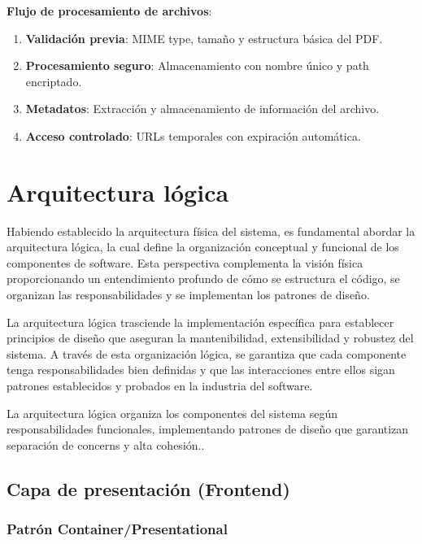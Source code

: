 \documentclass[12pt,a4paper,oneside]{report}
\providecommand{\tightlist}{%
  \setlength{\itemsep}{0pt}\setlength{\parskip}{0pt}}
\begin{document}
\textbf{Flujo de procesamiento de archivos}:

\begin{enumerate}
\def\labelenumi{\arabic{enumi}.}
\tightlist
\item
  \textbf{Validación previa}: MIME type, tamaño y estructura básica del
  PDF.
\item
  \textbf{Procesamiento seguro}: Almacenamiento con nombre único y path
  encriptado.
\item
  \textbf{Metadatos}: Extracción y almacenamiento de información del
  archivo.
\item
  \textbf{Acceso controlado}: URLs temporales con expiración automática.
\end{enumerate}

\section{Arquitectura lógica}\label{arquitectura-luxf3gica}

Habiendo establecido la arquitectura física del sistema, es fundamental
abordar la arquitectura lógica, la cual define la organización
conceptual y funcional de los componentes de software. Esta perspectiva
complementa la visión física proporcionando un entendimiento profundo de
cómo se estructura el código, se organizan las responsabilidades y se
implementan los patrones de diseño.

La arquitectura lógica trasciende la implementación específica para
establecer principios de diseño que aseguran la mantenibilidad,
extensibilidad y robustez del sistema. A través de esta organización
lógica, se garantiza que cada componente tenga responsabilidades bien
definidas y que las interacciones entre ellos sigan patrones
establecidos y probados en la industria del software.

La arquitectura lógica organiza los componentes del sistema según
responsabilidades funcionales, implementando patrones de diseño que
garantizan separación de concerns y alta cohesión..

\subsection{Capa de presentación
(Frontend)}\label{capa-de-presentaciuxf3n-frontend}

\subsubsection{Patrón
Container/Presentational}\label{patruxf3n-containerpresentational}
\end{document}
